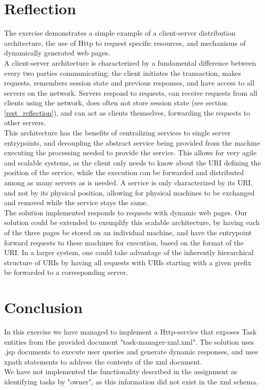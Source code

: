 	\section{Reflection}
	\label{servlet_reflection}
		The exercise demonstrates a simple example of a client-server distribution architecture, the use of Http to request specific resources, and mechanisms of dynamically generated web pages.\\
		A client-server architecture is characterized by a fundamental difference between every two parties communicating; the client initiates the transaction, makes requests, remembers session state and previous responses, and have access to all servers on the network. Servers respond to requests, can receive requests from all clients using the network, does often not store session state (see section \ref{rest_reflection}), and can act as clients themselves, forwarding the requests to other servers.\\
		This architecture has the benefits of centralizing services to single server entrypoints, and decoupling the abstract service being provided from the machine executing the processing needed to provide the service. This allows for very agile and scalable systems, as the client only needs to know about the URI defining the position of the service, while the execution can be forwarded and distributed among as many servers as is needed. A service is only characterized by its URI, and not by its physical position, allowing for physical machines to be exchanged and removed while the service stays the same. \\
		The solution implemented responds to requests with dynamic web pages. Our solution could be extended to exemplify this scalable architecture, by having each of the three pages be stored on an individual machine, and have the entrypoint forward requests to these machines for execution, based on the format of the URI. In a larger system, one could take advantage of the inherently hierarchical structure of URIs by having all requests with URIs starting with a given prefix be forwarded to a corresponding server.
	\section{Conclusion}
	\label{servlet_conclusion}
		In this exercise we have managed to implement a Http-service that exposes Task entities from the provided document "task-manager-xml.xml". The solution uses .jsp documents to execute user queries and generate dynamic responses, and uses xpath statements to address the contents of the xml document. \\
		We have not implemented the functionality described in the assignment as identifying tasks by "owner", as this information did not exist in the xml schema.